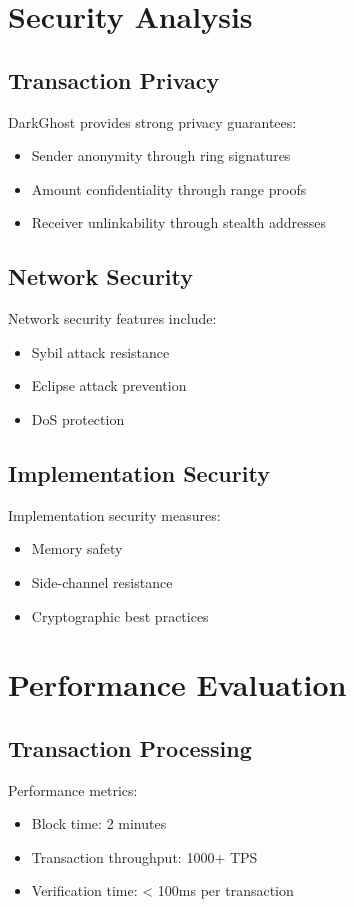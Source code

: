 \documentclass[11pt]{article}
\begin{document}
\section{Security Analysis}
\subsection{Transaction Privacy}
DarkGhost provides strong privacy guarantees:
\begin{itemize}
    \item Sender anonymity through ring signatures
    \item Amount confidentiality through range proofs
    \item Receiver unlinkability through stealth addresses
\end{itemize}

\subsection{Network Security}
Network security features include:
\begin{itemize}
    \item Sybil attack resistance
    \item Eclipse attack prevention
    \item DoS protection
\end{itemize}

\subsection{Implementation Security}
Implementation security measures:
\begin{itemize}
    \item Memory safety
    \item Side-channel resistance
    \item Cryptographic best practices
\end{itemize}

\section{Performance Evaluation}
\subsection{Transaction Processing}
Performance metrics:
\begin{itemize}
    \item Block time: 2 minutes
    \item Transaction throughput: 1000+ TPS
    \item Verification time: < 100ms per transaction
\end{itemize}
\end{document}
